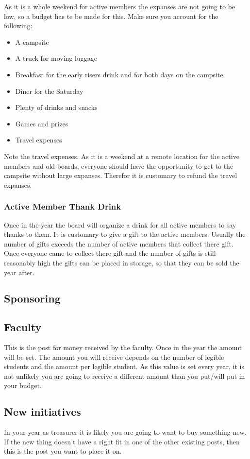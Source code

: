 \documentclass{report}
\begin{document}
As it is a whole weekend for active members the expanses are not going to be low, so a budget has te be made for this. Make sure you account for the following:
\begin{itemize}
	\item A campsite
	\item A truck for moving luggage
	\item Breakfast for the early risers drink and for both days on the campsite
	\item Diner for the Saturday
	\item Plenty of drinks and snacks
	\item Games and prizes
	\item Travel expenses 
\end{itemize}
Note the travel expenses. As it is a weekend at a remote location for the active members and old boards, everyone should have the opportunity to get to the campsite without large expanses. Therefor it is customary to refund the travel expanses.
 
\subsubsection{Active Member Thank Drink}
Once in the year the board will organize a drink for all active members to say thanks to them. It is customary to give a gift to the active members. Usually the number of gifts exceeds the number of active members that collect there gift. Once everyone came to collect there gift and the number of gifts is still reasonably high the gifts can be placed in storage, so that they can be sold the year after. 
\subsection{Sponsoring}
\subsection{Faculty}
This is the post for money received by the faculty. Once in the year the amount will be set. The amount you will receive depends on the number of legible students and the amount per legible student. As this value is set every year, it is not unlikely you are going to receive a different amount than you put/will put in your budget.
\subsection{New initiatives}
In your year as treasurer it is likely you are going to want to buy something new. If the new thing doesn't have a right fit in one of the other existing posts, then this is the post you want to place it on.
\end{document}
